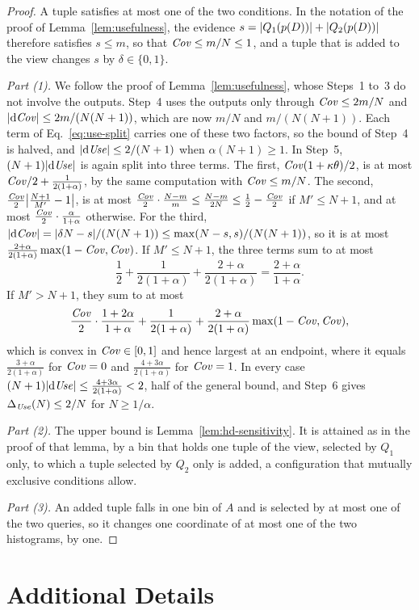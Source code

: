 \begin{proof}
A tuple satisfies at most one of the two conditions.
In the notation of the proof of Lemma~\ref{lem:usefulness}, the evidence $s=|Q_1(p(D))|+|Q_2(p(D))|$ therefore satisfies $s\le m$, so that $\mathit{Cov}\le m/N\le1$, and a tuple that is added to the view changes $s$ by $\delta\in\{0,1\}$.

\emph{Part (1).}
We follow the proof of Lemma~\ref{lem:usefulness}, whose Steps~1 to~3 do not involve the outputs.
Step~4 uses the outputs only through $\mathit{Cov}\le2m/N$ and $|\mathrm{d}\mathit{Cov}|\le2m/(N(N+1))$, which are now $m/N$ and $m/(N(N+1))$.
Each term of Eq.~\eqref{eq:use-split} carries one of these two factors, so the bound of Step~4 is halved, and $|\mathrm{d}\mathit{Use}|\le2/(N+1)$ when $\alpha(N+1)\ge1$.
In Step~5, $(N+1)|\mathrm{d}\mathit{Use}|$ is again split into three terms.
The first, $\mathit{Cov}(1+\kappa\theta)/2$, is at most $\mathit{Cov}/2+\frac{1}{2(1+\alpha)}$, by the same computation with $\mathit{Cov}\le m/N$.
The second, $\frac{\mathit{Cov}}{2}\big|\frac{N+1}{M'}-1\big|$, is at most $\frac{\mathit{Cov}}{2}\cdot\frac{N-m}{m}\le\frac{N-m}{2N}\le\frac12-\frac{\mathit{Cov}}{2}$ if $M'\le N+1$, and at most $\frac{\mathit{Cov}}{2}\cdot\frac{\alpha}{1+\alpha}$ otherwise.
For the third, $|\mathrm{d}\mathit{Cov}|=|\delta N-s|/(N(N+1))\le\max(N-s,s)/(N(N+1))$, so it is at most $\frac{2+\alpha}{2(1+\alpha)}\max(1-\mathit{Cov},\mathit{Cov})$.
If $M'\le N+1$, the three terms sum to at most
\[
\frac12+\frac{1}{2(1+\alpha)}+\frac{2+\alpha}{2(1+\alpha)}=\frac{2+\alpha}{1+\alpha} .
\]
If $M'>N+1$, they sum to at most
\[
\frac{\mathit{Cov}}{2}\cdot\frac{1+2\alpha}{1+\alpha}+\frac{1}{2(1+\alpha)}+\frac{2+\alpha}{2(1+\alpha)}\max(1-\mathit{Cov},\mathit{Cov}) ,
\]
which is convex in $\mathit{Cov}\in[0,1]$ and hence largest at an endpoint, where it equals $\frac{3+\alpha}{2(1+\alpha)}$ for $\mathit{Cov}=0$ and $\frac{4+3\alpha}{2(1+\alpha)}$ for $\mathit{Cov}=1$.
In every case $(N+1)|\mathrm{d}\mathit{Use}|\le\frac{4+3\alpha}{2(1+\alpha)}<2$, half of the general bound, and Step~6 gives $\Delta_{\mathit{Use}}(N)\le2/N$ for $N\ge1/\alpha$.

\emph{Part (2).}
The upper bound is Lemma~\ref{lem:hd-sensitivity}.
It is attained as in the proof of that lemma, by a bin that holds one tuple of the view, selected by $Q_1$ only, to which a tuple selected by $Q_2$ only is added, a configuration that mutually exclusive conditions allow.

\emph{Part (3).}
An added tuple falls in one bin of $A$ and is selected by at most one of the two queries, so it changes one coordinate of at most one of the two histograms, by one.
\end{proof}

\section{Additional Details}
\label{app:details}

